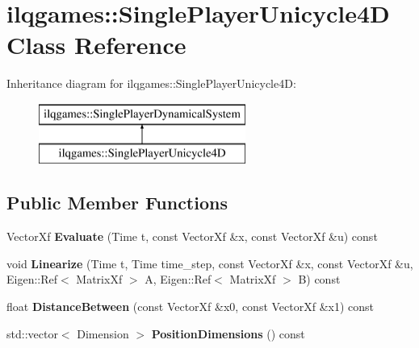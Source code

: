 \hypertarget{classilqgames_1_1_single_player_unicycle4_d}{}\section{ilqgames\+:\+:Single\+Player\+Unicycle4D Class Reference}
\label{classilqgames_1_1_single_player_unicycle4_d}
Inheritance diagram for ilqgames\+:\+:Single\+Player\+Unicycle4D\+:\begin{figure}[H]
\begin{center}
\leavevmode
\includegraphics[height=2.000000cm]{classilqgames_1_1_single_player_unicycle4_d}
\end{center}
\end{figure}
\subsection*{Public Member Functions}
\begin{DoxyCompactItemize}
\item 
Vector\+Xf {\bfseries Evaluate} (Time t, const Vector\+Xf \&x, const Vector\+Xf \&u) const \hypertarget{classilqgames_1_1_single_player_unicycle4_d_a2d09bc46b962db25724fe381d44ecd5f}{}\label{classilqgames_1_1_single_player_unicycle4_d_a2d09bc46b962db25724fe381d44ecd5f}

\item 
void {\bfseries Linearize} (Time t, Time time\+\_\+step, const Vector\+Xf \&x, const Vector\+Xf \&u, Eigen\+::\+Ref$<$ Matrix\+Xf $>$ A, Eigen\+::\+Ref$<$ Matrix\+Xf $>$ B) const \hypertarget{classilqgames_1_1_single_player_unicycle4_d_a1b433ba55fba0620c251215e5927fe06}{}\label{classilqgames_1_1_single_player_unicycle4_d_a1b433ba55fba0620c251215e5927fe06}

\item 
float {\bfseries Distance\+Between} (const Vector\+Xf \&x0, const Vector\+Xf \&x1) const \hypertarget{classilqgames_1_1_single_player_unicycle4_d_a8e07e462f3b1efe63ae0f14ee286d657}{}\label{classilqgames_1_1_single_player_unicycle4_d_a8e07e462f3b1efe63ae0f14ee286d657}

\item 
std\+::vector$<$ Dimension $>$ {\bfseries Position\+Dimensions} () const \hypertarget{classilqgames_1_1_single_player_unicycle4_d_a5afe7f51a1c3c1884effcf38e4849c26}{}\label{classilqgames_1_1_single_player_unicycle4_d_a5afe7f51a1c3c1884effcf38e4849c26}

\end{DoxyCompactItemize}

